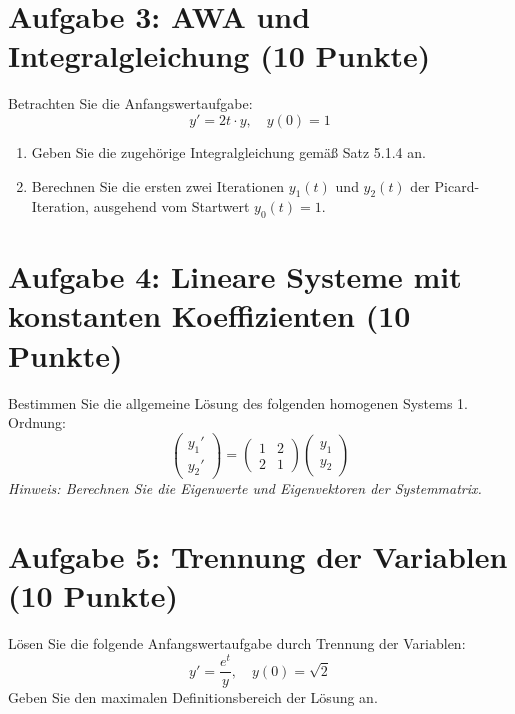 \newpage

\section*{Aufgabe 3: AWA und Integralgleichung (10 Punkte)}
Betrachten Sie die Anfangswertaufgabe:
\[ y' = 2t \cdot y, \quad y(0) = 1 \]
\begin{enumerate}
    \item Geben Sie die zugehörige Integralgleichung gemäß Satz 5.1.4 an.
    \item Berechnen Sie die ersten zwei Iterationen $y_1(t)$ und $y_2(t)$ der Picard-Iteration, ausgehend vom Startwert $y_0(t) = 1$.
\end{enumerate}

\newpage

\section*{Aufgabe 4: Lineare Systeme mit konstanten Koeffizienten (10 Punkte)}
Bestimmen Sie die allgemeine Lösung des folgenden homogenen Systems 1. Ordnung:
\[
\begin{pmatrix} y_1' \\ y_2' \end{pmatrix} = \begin{pmatrix} 1 & 2 \\ 2 & 1 \end{pmatrix} \begin{pmatrix} y_1 \\ y_2 \end{pmatrix}
\]
\textit{Hinweis: Berechnen Sie die Eigenwerte und Eigenvektoren der Systemmatrix.}

\newpage

\section*{Aufgabe 5: Trennung der Variablen (10 Punkte)}
Lösen Sie die folgende Anfangswertaufgabe durch Trennung der Variablen:
\[ y' = \frac{e^t}{y}, \quad y(0) = \sqrt{2} \]
Geben Sie den maximalen Definitionsbereich der Lösung an.